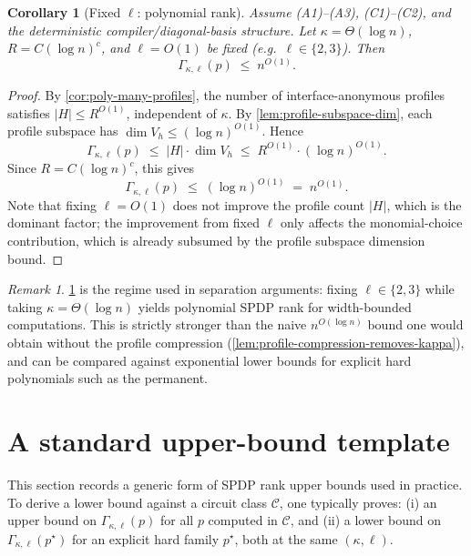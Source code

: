 \documentclass[12pt]{article}
\newtheorem{corollary}[theorem]{Corollary}
\theoremstyle{definition}
\theoremstyle{remark}
\newtheorem{remark}[theorem]{Remark}
\begin{document}
\begin{corollary}[Fixed $\ell$: polynomial rank]
\label{cor:poly-rank-fixed-ell}
Assume (A1)--(A3), (C1)--(C2), and the deterministic compiler\slash diagonal-basis structure.
Let $\kappa=\Theta(\log n)$, $R=C(\log n)^c$, and $\ell=O(1)$ be fixed (e.g.\ $\ell\in\{2,3\}$).
Then
\[
\Gamma_{\kappa,\ell}(p) \;\le\; n^{O(1)}.
\]
\end{corollary}

\begin{proof}
By \ref{cor:poly-many-profiles}, the number of interface-anonymous profiles
satisfies $|H|\le R^{O(1)}$, independent of $\kappa$. By \ref{lem:profile-subspace-dim},
each profile subspace has $\dim V_h \le (\log n)^{O(1)}$. Hence
\[
\Gamma_{\kappa,\ell}(p)
\;\le\;
|H|\cdot \dim V_h
\;\le\;
R^{O(1)}\cdot (\log n)^{O(1)}.
\]
Since $R = C(\log n)^c$, this gives
\[
\Gamma_{\kappa,\ell}(p) \;\le\; (\log n)^{O(1)} \;=\; n^{O(1)}.
\]
Note that fixing $\ell=O(1)$ does not improve the profile count $|H|$, which is the
dominant factor; the improvement from fixed $\ell$ only affects the monomial-choice
contribution, which is already subsumed by the profile subspace dimension bound.
\end{proof}

\begin{remark}
\ref{cor:poly-rank-fixed-ell} is the regime used in separation arguments:
fixing $\ell \in \{2,3\}$ while taking $\kappa = \Theta(\log n)$ yields polynomial
SPDP rank for width-bounded computations. This is strictly
stronger than the naive $n^{O(\log n)}$ bound one would obtain without the profile
compression (\ref{lem:profile-compression-removes-kappa}), and can be compared
against exponential lower bounds for explicit hard polynomials such as the permanent.
\end{remark}

\section{A standard upper-bound template}
\label{sec:upper-bound-template}

This section records a generic form of SPDP rank upper bounds used in practice.
To derive a lower bound against a circuit class $\mathcal{C}$, one typically proves:
(i) an upper bound on $\Gamma_{\kappa,\ell}(p)$ for all $p$ computed in $\mathcal{C}$, and
(ii) a lower bound on $\Gamma_{\kappa,\ell}(p^\star)$ for an explicit hard family $p^\star$,
both at the same $(\kappa,\ell)$.
\end{document}
